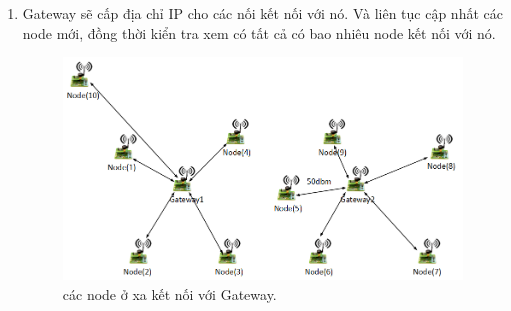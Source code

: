 \begin{enumerate}
\item Gateway sẽ cấp địa chỉ IP cho các nối kết nối với nó. Và liên tục cập nhất các node mới, đồng thời kiển tra xem có tất cả có bao nhiêu node kết nối với nó.
\begin{center}
    \begin{figure}[htp]
    \begin{center}
     \includegraphics[scale=0.45]{image2/nodexa.png}
    \end{center}
    \caption{các node ở xa kết nối với Gateway.}
    \label{refhinh1}
    \end{figure}
\end{center}
 
    
\end{enumerate}

